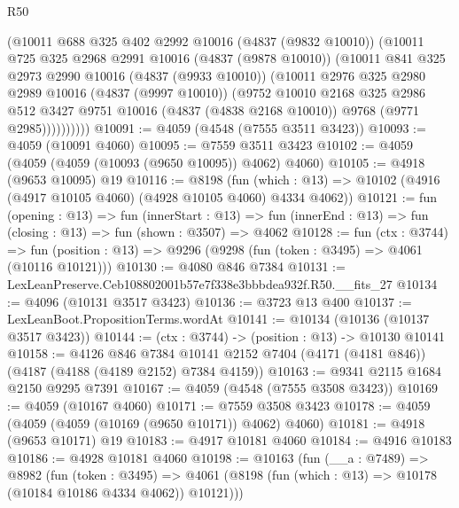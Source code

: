 \begin{lexlean}{R50}
\begin{coremodule}
            (@10011
              @688
              @325
              @402
              @2992
              @10016
              (@4837 (@9832 @10010))
              (@10011
                @725
                @325
                @2968
                @2991
                @10016
                (@4837 (@9878 @10010))
                (@10011
                  @841
                  @325
                  @2973
                  @2990
                  @10016
                  (@4837 (@9933 @10010))
                  (@10011
                    @2976
                    @325
                    @2980
                    @2989
                    @10016
                    (@4837 (@9997 @10010))
                    (@9752
                      @10010
                      @2168
                      @325
                      @2986
                      @512
                      @3427
                      @9751
                      @10016
                      (@4837 (@4838 @2168 @10010))
                      @9768
                      (@9771 @2985))))))))))
@10091 := @4059 (@4548 (@7555 @3511 @3423))
@10093 := @4059 (@10091 @4060)
@10095 := @7559 @3511 @3423
@10102 := @4059 (@4059 (@4059 (@10093 (@9650 @10095)) @4062) @4060)
@10105 := @4918 (@9653 @10095) @19
@10116 := @8198
    (fun (which : @13) => @10102 (@4916 (@4917 @10105 @4060) (@4928 @10105 @4060) @4334 @4062))
@10121 := fun (opening : @13) =>
  fun (innerStart : @13) =>
  fun (innerEnd : @13) => fun (closing : @13) => fun (shown : @3507) => @4062
@10128 := fun (ctx : @3744) =>
  fun (position : @13) => @9296 (@9298 (fun (token : @3495) => @4061 (@10116 @10121)))
@10130 := @4080 @846 @7384
@10131 := LexLeanPreserve.Ceb108802001b57e7f338e3bbbdea932f.R50.__fits_27
@10134 := @4096 (@10131 @3517 @3423)
@10136 := @3723 @13 @400
@10137 := LexLeanBoot.PropositionTerms.wordAt
@10141 := @10134 (@10136 (@10137 @3517 @3423))
@10144 := (ctx : @3744) -> (position : @13) -> @10130 @10141
@10158 := @4126
    @846
    @7384
    @10141
    @2152
    @7404
    (@4171 (@4181 @846))
    (@4187 (@4188 (@4189 @2152) @7384 @4159))
@10163 := @9341 @2115 @1684 @2150 @9295 @7391
@10167 := @4059 (@4548 (@7555 @3508 @3423))
@10169 := @4059 (@10167 @4060)
@10171 := @7559 @3508 @3423
@10178 := @4059 (@4059 (@4059 (@10169 (@9650 @10171)) @4062) @4060)
@10181 := @4918 (@9653 @10171) @19
@10183 := @4917 @10181 @4060
@10184 := @4916 @10183
@10186 := @4928 @10181 @4060
@10198 := @10163
    (fun (__a : @7489) =>
    @8982
      (fun (token : @3495) =>
      @4061 (@8198 (fun (which : @13) => @10178 (@10184 @10186 @4334 @4062)) @10121)))

\end{coremodule}
\end{lexlean}
